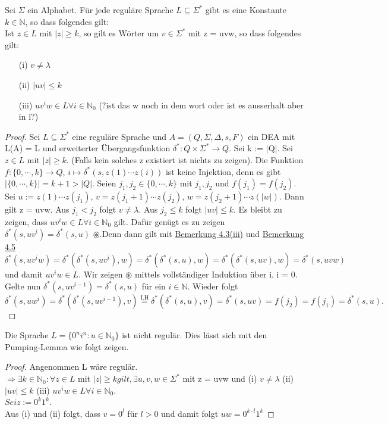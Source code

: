   Sei \(\Sigma\) ein Alphabet. Für jede reguläre Sprache \(L \subseteq \Sigma^*\) gibt es eine Konstante \(k \in \mathbb{N}\), so dass folgendes gilt:\\ Ist \(z \in L\) mit \(|z| \geq k\), so gilt es Wörter um \(v \in \Sigma^*\) mit z = uvw, so dass folgendes gilt:
  \begin{itemize}
    \item [(i)]\(v \not = \lambda\)
    \item [(ii)]\(|uv| \leq k\)
    \item [(iii)]\(uv^iw \in L \forall i \in \mathbb{N}_0\) (?ist das w noch in dem wort oder ist es ausserhalt aber in l?)
  \end{itemize} 
  \begin{proof}
    Sei \(L \subseteq \Sigma^*\) eine reguläre Sprache und \(A = (Q, \Sigma, \Delta, s, F)\) ein DEA mit L(A) = L und erweiterter Übergangsfunktion \(\delta^*: Q \times \Sigma^* \to Q\). Sei k := |Q|. Sei \(z \in L\)  mit \(|z| \geq k\). (Falls kein solches z existiert ist nichts zu zeigen). Die Funktion \(f: \{0,\cdots, k\} \to Q\), \(i \mapsto \delta^*(s, z(1) \cdots z(i))\) ist keine Injektion, denn es gibt \(|\{0, \cdots, k\}| = k + 1 > |Q|\). Seien \(j_1, j_2 \in \{0, \cdots, k\}\) mit \(j_1, j_2\) und \(f(j_1) = f(j_2)\). Sei \(u := z(1)\cdots z(j_1)\), \(v = z(j_1+1)\cdots z(j_2)\), \(w = z(j_2 + 1) \cdots z(|w|)\). Dann gilt z = uvw. Aus \(j_1 < j_2\) folgt \(v \not = \lambda\). Aus \(j_2 \leq k\) folgt \(|uv| \leq k\). Es bleibt zu zeigen, dass \(uv^iw\in L \forall i \in \mathbb{N}_0\) gilt. Dafür genügt es zu zeigen \(\delta^*(s, uv^i) = \delta^*(s, u)\) \(\circledast \).Denn dann gilt mit \hyperref[subsec:4.3]{Bemerkung 4.3(iii)} und \hyperref[subsec:4.5]{Bemerkung 4.5} 
    \[
      \delta^*(s, uv^iw) = \delta^*(\delta^*(s, uv^i), w) = \delta^* (\delta^*(s, u), w) = \delta^*(\delta^*(s, uv), w) = \delta^*(s, uvw)
    \] 
    und damit \(uv^iw \in L\). Wir zeigen \(\circledast \) mittels vollständiger Induktion über i. i = 0. Gelte nun \(\delta^*(s, uv^{i-1}) = \delta^*(s, u)\) für ein \(i \in \mathbb{N}\). Wieder folgt 
    \[
      \delta^{*}(s, uw^i) = \delta^*(\delta^*(s, uv^{i-1}), v) \stackrel{\text{I.H}}{=} \delta^*(\delta^*(s,u), v) = \delta^*(s, uv) = f(j_2) = f(j_1) = \delta^*(s,u).
    \]
  \end{proof}

    Die Sprache \(L = \{0^n i^n : u \in \mathbb{N}_0\}\) ist nicht regulär. Dies lässt sich mit den Pumping-Lemma wie folgt zeigen.

    \begin{proof}
      Angenommen L wäre regulär.\\
      \(\Rightarrow \exists k \in \mathbb{N}_0 : \forall z \in L\) mit \(|z| \geq k gilt, \exists u, v, w \in \Sigma^*\) mit z = uvw und (i) \(v \not = \lambda\) (ii) \(|uv| \leq k\) (iii) \(uv^i w \in L \forall i \in \mathbb{N}_0\). \\ \(Sei z:= 0^k 1^k\). \\Aus (i) und (ii) folgt, dass \(v = 0^l\) für \(l > 0\) und damit folgt \(uw = 0^{k\cdot l} 1^k\)
    \end{proof}
  

